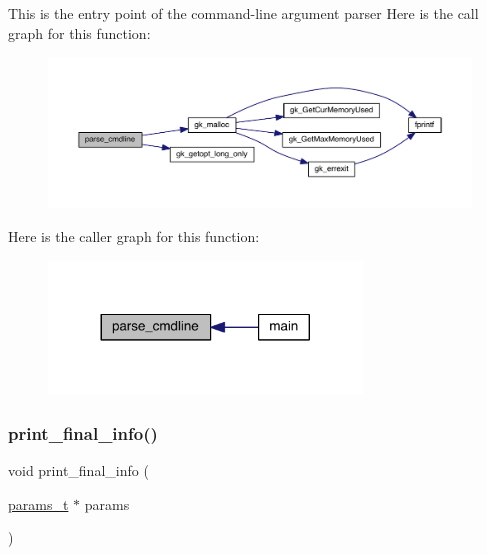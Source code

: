 This is the entry point of the command-\/line argument parser Here is the call graph for this function\+:\nopagebreak
\begin{figure}[H]
\begin{center}
\leavevmode
\includegraphics[width=350pt]{a00149_a0e7ce196a2f8882777957bf898739f6f_cgraph}
\end{center}
\end{figure}
Here is the caller graph for this function\+:\nopagebreak
\begin{figure}[H]
\begin{center}
\leavevmode
\includegraphics[width=236pt]{a00149_a0e7ce196a2f8882777957bf898739f6f_icgraph}
\end{center}
\end{figure}
\mbox{\label{a00149_a702976a4c55992ddbfc1918ec1b70943}} 
\subsubsection{\texorpdfstring{print\+\_\+final\+\_\+info()}{print\_final\_info()}}
{\footnotesize\ttfamily void print\+\_\+final\+\_\+info (\begin{DoxyParamCaption}\item[{\hyperlink{a00706}{params\+\_\+t} $\ast$}]{params }\end{DoxyParamCaption})}

